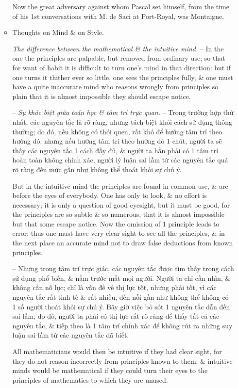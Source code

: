 \documentclass{article}
\begin{document}
\begin{enumerate}
\begin{itemize}
		Now the great adversary against whom {\sc Pascal} set himself, from the time of his 1st conversations with {\sc M. de Saci} at Port-Royal, was {\sc Montaigne}. 
		
		
		\item {\sf Thoughts on Mind \& on Style.}
		
		 {\it The difference between the mathematical \& the intuitive mind.} -- In the one the principles are palpable, but removed from ordinary use; so that for want of habit it is difficult to turn one's mind in that direction: but if one turns it thither ever so little, one sees the principles fully, \& one must have a quite inaccurate mind who reasons wrongly from principles so plain that it is almost impossible they should escape notice.
		
		-- {\it Sự khác biệt giữa toán học \& tâm trí trực quan.} -- Trong trường hợp thứ nhất, các nguyên tắc là rõ ràng, nhưng tách biệt khỏi cách sử dụng thông thường; do đó, nếu không có thói quen, rất khó để hướng tâm trí theo hướng đó: nhưng nếu hướng tâm trí theo hướng đó 1 chút, người ta sẽ thấy các nguyên tắc 1 cách đầy đủ, \& người ta hẳn phải có 1 tâm trí hoàn toàn không chính xác, người lý luận sai lầm từ các nguyên tắc quá rõ ràng đến mức gần như không thể thoát khỏi sự chú ý.
		
		But in the intuitive mind the principles are found in common use, \& are before the eyes of everybody. One has only to look, \& no effort is necessary; it is only a question of good eyesight, but it must be good, for the principles are so subtle \& so numerous, that it is almost impossible but that some escape notice. Now the omission of 1 principle leads to error; thus one must have very clear sight to see all the principles, \& in the next place an accurate mind not to draw false deductions from known principles.
		
		-- Nhưng trong tâm trí trực giác, các nguyên tắc được tìm thấy trong cách sử dụng phổ biến, \& nằm trước mắt mọi người. Người ta chỉ cần nhìn, \& không cần nỗ lực; chỉ là vấn đề về thị lực tốt, nhưng phải tốt, vì các nguyên tắc rất tinh tế \& rất nhiều, đến nỗi gần như không thể không có 1 số người thoát khỏi sự chú ý. Bây giờ việc bỏ sót 1 nguyên tắc dẫn đến sai lầm; do đó, người ta phải có thị lực rất rõ ràng để thấy tất cả các nguyên tắc, \& tiếp theo là 1 tâm trí chính xác để không rút ra những suy luận sai lầm từ các nguyên tắc đã biết.
				
		All mathematicians would then be intuitive if they had clear sight, for they do not reason incorrectly from principles known to them; \& intuitive minds would be mathematical if they could turn their eyes to the principles of mathematics to which they are unused.
		

\end{itemize}
\end{enumerate}
\end{document}
